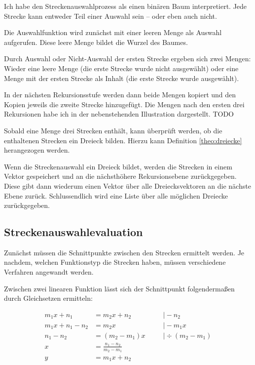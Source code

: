 Ich habe den Streckenauswahlprozess als einen binären Baum interpretiert. Jede Strecke kann entweder Teil einer Auswahl sein -- oder eben auch nicht.

Die Auswahlfunktion wird zunächst mit einer leeren Menge als Auswahl aufgerufen.
Diese leere Menge bildet die Wurzel des Baumes.

Durch Auswahl oder Nicht-Auswahl der ersten Strecke ergeben sich zwei Mengen: Wieder eine
leere Menge (die erste Strecke wurde nicht ausgewählt) oder eine Menge mit der ersten
Strecke als Inhalt (die erste Strecke wurde ausgewählt).

In der nächsten Rekursionsstufe werden dann beide Mengen kopiert und den Kopien jeweils
die zweite Strecke hinzugefügt. Die Mengen nach den ersten drei Rekursionen habe ich
in der nebenstehenden Illustration dargestellt. TODO

Sobald eine Menge drei Strecken enthält, kann überprüft werden, ob die enthaltenen
Strecken ein Dreieck bilden.
Hierzu kann Definition \ref{theo:dreiecke} herangezogen werden.

Wenn die Streckenauswahl ein Dreieck bildet, werden die Strecken in einem Vektor
gespeichert und an die nächsthöhere Rekursionsebene zurückgegeben.
Diese gibt dann wiederum einen Vektor über alle Dreiecksvektoren an die nächste Ebene
zurück.
Schlussendlich wird eine Liste über alle möglichen Dreiecke zurückgegeben.

\subsection{Streckenauswahlevaluation}
Zunächst müssen die Schnittpunkte zwischen den Strecken ermittelt werden.
Je nachdem, welchen Funktionstyp die Strecken haben,
müssen verschiedene Verfahren angewandt werden.

Zwischen zwei linearen Funktion lässt sich der Schnittpunkt folgendermaßen durch
Gleichsetzen ermitteln:

\begin{equation}
    \begin{aligned}
        m_1x+n_1 &= m_2x+n_2             &&\quad\vert -n_2          \\
        m_1x+n_1-n_2 &= m_2x             &&\quad\vert -m_1x         \\
        n_1-n_2 &= (m_2-m_1)x            &&\quad\vert \div(m_2-m_1) \\
        x &= \frac{n_1-n_2}{m_2-m_1}                                \\
        y &= m_1x+n_2                                               \\
    \end{aligned}
    \label{eq:linearschnitt}
\end{equation}

